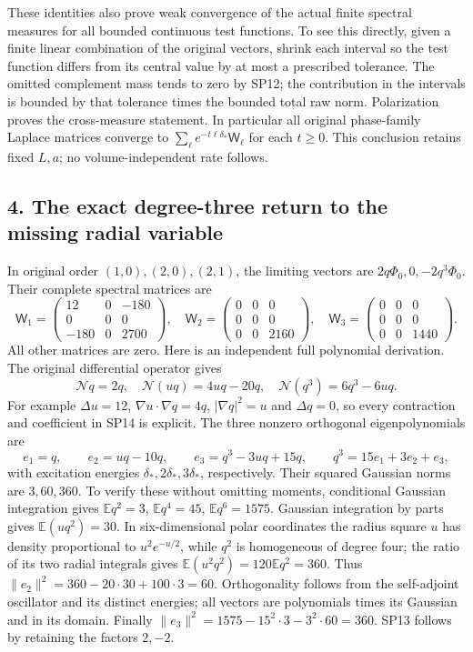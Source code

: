 \documentclass[11pt]{article}
\begin{document}
These identities also prove weak convergence of the actual finite spectral measures for all bounded continuous test functions. To see this directly, given a finite linear combination of the original vectors, shrink each interval so the test function differs from its central value by at most a prescribed tolerance. The omitted complement mass tends to zero by SP12; the contribution in the intervals is bounded by that tolerance times the bounded total raw norm. Polarization proves the cross-measure statement. In particular all original phase-family Laplace matrices converge to \(\sum_\ell e^{-t\ell\delta_*}\mathsf W_\ell\) for each \(t\ge0\). This conclusion retains fixed \(L,a\); no volume-independent rate follows.

\subsection*{4. The exact degree-three return to the missing radial variable}

In original order \((1,0),(2,0),(2,1)\), the limiting vectors are \(2q\Phi_0,0,-2q^3\Phi_0\). Their complete spectral matrices are
\[
 \mathsf W_1=\begin{pmatrix}12&0&-180\\0&0&0\\-180&0&2700\end{pmatrix},\quad
 \mathsf W_2=\begin{pmatrix}0&0&0\\0&0&0\\0&0&2160\end{pmatrix},\quad
 \mathsf W_3=\begin{pmatrix}0&0&0\\0&0&0\\0&0&1440\end{pmatrix}.
 \tag{SP13}
\]
All other matrices are zero. Here is an independent full polynomial derivation. The original differential operator gives
\[
 \mathcal N q=2q,\quad
 \mathcal N(uq)=4uq-20q,\quad
 \mathcal N(q^3)=6q^3-6uq.
 \tag{SP14}
\]
For example \(\Delta u=12\), \(\nabla u\cdot\nabla q=4q\), \(|\nabla q|^2=u\) and \(\Delta q=0\), so every contraction and coefficient in SP14 is explicit. The three nonzero orthogonal eigenpolynomials are
\[
 e_1=q,\qquad e_2=uq-10q,\qquad
 e_3=q^3-3uq+15q,\qquad q^3=15e_1+3e_2+e_3,
 \tag{SP15}
\]
with excitation energies \(\delta_*,2\delta_*,3\delta_*\), respectively. Their squared Gaussian norms are \(3,60,360\). To verify these without omitting moments, conditional Gaussian integration gives \(\mathbb E q^2=3\), \(\mathbb E q^4=45\), \(\mathbb E q^6=1575\). Gaussian integration by parts gives \(\mathbb E(uq^2)=30\). In six-dimensional polar coordinates the radius square \(u\) has density proportional to \(u^2e^{-u/2}\), while \(q^2\) is homogeneous of degree four; the ratio of its two radial integrals gives \(\mathbb E(u^2q^2)=120\mathbb E q^2=360\). Thus \(\|e_2\|^2=360-20\cdot30+100\cdot3=60\). Orthogonality follows from the self-adjoint oscillator and its distinct energies; all vectors are polynomials times its Gaussian and in its domain. Finally \(\|e_3\|^2=1575-15^2\cdot3-3^2\cdot60=360\). SP13 follows by retaining the factors \(2,-2\).
\end{document}
